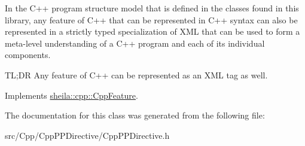 In the C++ program structure model that is defined in the classes found in this library, any feature of C++ that can be represented in C++ syntax can also be represented in a strictly typed specialization of X\+ML that can be used to form a meta-\/level understanding of a C++ program and each of it\textquotesingle{}s individual components.

TL;DR Any feature of C++ can be represented as an X\+ML tag as well. 

Implements \hyperlink{classsheila_1_1cpp_1_1CppFeature_af32851fe8b1ce92bac4318605f0173db}{sheila\+::cpp\+::\+Cpp\+Feature}.



The documentation for this class was generated from the following file\+:\begin{DoxyCompactItemize}
\item 
src/\+Cpp/\+Cpp\+P\+P\+Directive/Cpp\+P\+P\+Directive.\+h\end{DoxyCompactItemize}
